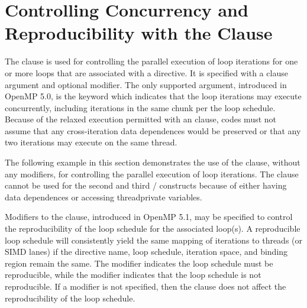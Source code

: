\section{Controlling Concurrency and Reproducibility with 
the  Clause}
\label{sec:reproducible_modifier}


The  clause is used for controlling the parallel execution of 
loop iterations for one or more loops that are associated with a directive. 
It is specified with a clause argument and optional modifier. 
The only supported argument, introduced in OpenMP 5.0, is the keyword 
 which indicates that the loop iterations may execute 
concurrently, including iterations in the same chunk per the loop schedule. 
Because of the relaxed execution permitted with an  
clause, codes must not assume that any cross-iteration data dependences 
would be preserved or that any two iterations may execute on the same thread.

The following example in this section demonstrates the use of 
the  clause, without any modifiers, for controlling 
the parallel execution of loop iterations.
The  clause cannot be used for the second and third 
/ constructs because of either having 
data dependences or accessing threadprivate variables.



Modifiers to the  clause, introduced in OpenMP 5.1, may be 
specified to control the reproducibility of the loop schedule for 
the associated loop(s). A reproducible loop schedule will consistently 
yield the same mapping of iterations to threads (or SIMD lanes) if the 
directive name, loop schedule, iteration space, and binding region remain 
the same. The  modifier indicates the loop schedule must 
be reproducible, while the  modifier indicates that 
the loop schedule is not reproducible.
If a modifier is not specified, then the  clause does not affect 
the reproducibility of the loop schedule.

